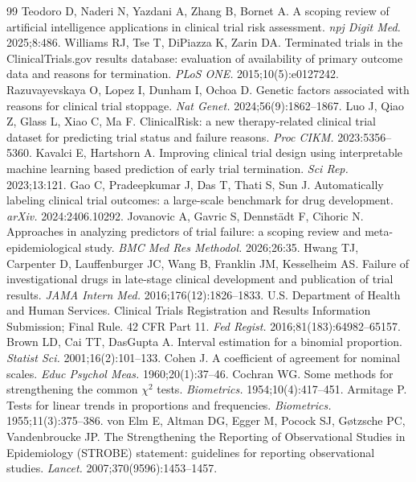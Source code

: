 \documentclass[11pt]{article}
\begin{document}
\begin{thebibliography}{99}
 Teodoro D, Naderi N, Yazdani A, Zhang B, Bornet A. A scoping review of artificial intelligence applications in clinical trial risk assessment. \emph{npj Digit Med.} 2025;8:486.
 Williams RJ, Tse T, DiPiazza K, Zarin DA. Terminated trials in the ClinicalTrials.gov results database: evaluation of availability of primary outcome data and reasons for termination. \emph{PLoS ONE.} 2015;10(5):e0127242.
 Razuvayevskaya O, Lopez I, Dunham I, Ochoa D. Genetic factors associated with reasons for clinical trial stoppage. \emph{Nat Genet.} 2024;56(9):1862--1867.
 Luo J, Qiao Z, Glass L, Xiao C, Ma F. ClinicalRisk: a new therapy-related clinical trial dataset for predicting trial status and failure reasons. \emph{Proc CIKM.} 2023:5356--5360.
 Kavalci E, Hartshorn A. Improving clinical trial design using interpretable machine learning based prediction of early trial termination. \emph{Sci Rep.} 2023;13:121.
 Gao C, Pradeepkumar J, Das T, Thati S, Sun J. Automatically labeling clinical trial outcomes: a large-scale benchmark for drug development. \emph{arXiv.} 2024:2406.10292.
 Jovanovic A, Gavric S, Dennst\"adt F, Cihoric N. Approaches in analyzing predictors of trial failure: a scoping review and meta-epidemiological study. \emph{BMC Med Res Methodol.} 2026;26:35.
 Hwang TJ, Carpenter D, Lauffenburger JC, Wang B, Franklin JM, Kesselheim AS. Failure of investigational drugs in late-stage clinical development and publication of trial results. \emph{JAMA Intern Med.} 2016;176(12):1826--1833.
 U.S. Department of Health and Human Services. Clinical Trials Registration and Results Information Submission; Final Rule. 42 CFR Part 11. \emph{Fed Regist.} 2016;81(183):64982--65157.
 Brown LD, Cai TT, DasGupta A. Interval estimation for a binomial proportion. \emph{Statist Sci.} 2001;16(2):101--133.
 Cohen J. A coefficient of agreement for nominal scales. \emph{Educ Psychol Meas.} 1960;20(1):37--46.
 Cochran WG. Some methods for strengthening the common $\chi^2$ tests. \emph{Biometrics.} 1954;\allowbreak \mbox{10(4):417--451}.
 Armitage P. Tests for linear trends in proportions and frequencies. \emph{Biometrics.} 1955;\allowbreak \mbox{11(3):375--386}.
 von Elm E, Altman DG, Egger M, Pocock SJ, G{\o}tzsche PC, Vandenbroucke JP. The Strengthening the Reporting of Observational Studies in Epidemiology (STROBE) statement: guidelines for reporting observational studies. \emph{Lancet.} 2007;370(9596):1453--1457.

\end{thebibliography}
\end{document}
